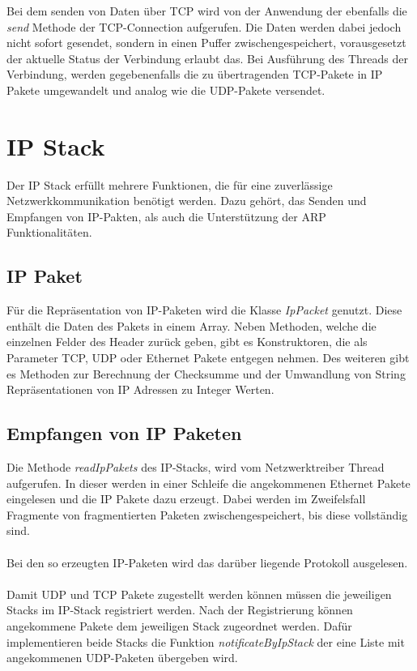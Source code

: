 Bei dem senden von Daten über TCP wird von der Anwendung der ebenfalls die \textit{send} Methode der TCP-Connection aufgerufen. Die Daten werden dabei jedoch nicht sofort gesendet, sondern in einen Puffer zwischengespeichert, vorausgesetzt der aktuelle Status der Verbindung erlaubt das. Bei Ausführung des Threads der Verbindung, werden gegebenenfalls die zu übertragenden TCP-Pakete in IP Pakete umgewandelt und analog wie die UDP-Pakete versendet. 



\section{IP Stack}
Der IP Stack erfüllt mehrere Funktionen, die für eine zuverlässige Netzwerkkommunikation benötigt werden. Dazu gehört, das Senden und Empfangen von IP-Pakten, als auch die Unterstützung der ARP Funktionalitäten.

\subsection{IP Paket}
Für die Repräsentation von IP-Paketen wird die Klasse \textit{IpPacket} genutzt. Diese enthält die Daten des Pakets in einem Array. Neben Methoden, welche die einzelnen Felder des Header zurück geben, gibt es Konstruktoren, die als Parameter TCP, UDP oder Ethernet Pakete entgegen nehmen. Des weiteren gibt es Methoden zur Berechnung der Checksumme und der Umwandlung von String Repräsentationen von IP Adressen zu Integer Werten.  

\subsection{Empfangen von IP Paketen}

Die Methode \textit{readIpPakets} des IP-Stacks, wird vom Netzwerktreiber Thread aufgerufen. In dieser werden in einer Schleife die angekommenen Ethernet Pakete eingelesen und die IP Pakete dazu erzeugt. Dabei werden im Zweifelsfall Fragmente von fragmentierten Paketen zwischengespeichert, bis diese vollständig sind. \\\\
Bei den so erzeugten IP-Paketen wird das darüber liegende Protokoll ausgelesen.\\\\
Damit UDP und TCP Pakete zugestellt werden können müssen die jeweiligen Stacks im IP-Stack registriert werden. Nach der Registrierung können angekommene  Pakete dem jeweiligen Stack zugeordnet werden. Dafür implementieren beide Stacks die Funktion \textit{notificateByIpStack} der eine Liste mit angekommenen UDP-Paketen übergeben wird. 

